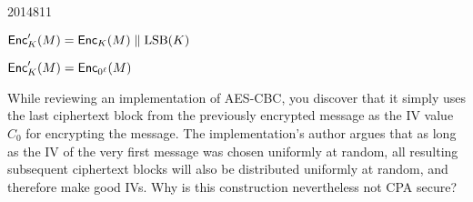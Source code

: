 \documentclass[10pt,\jkfside,a4paper]{article}
\theoremstyle{definition}
\newenvironment{qlist}[1][]{\begin{enumerate}[#1, labelsep=20pt]}{\end{enumerate}}
\newenvironment{question}{\begin{questionbox} \item}{\end{questionbox}}
\begin{document}
\begin{examquestion}{2014}{8}{11}
\begin{qlist}[label=(\textit{\alph*})]
\begin{qlist}[label=(\textit{\roman*})]
\begin{question}
            $\mathsf{Enc}_K'(M) = \mathsf{Enc}_K(M) \parallel \mathrm{LSB}(K)$

        \end{question}


        \begin{question}

            $\mathsf{Enc}_K'(M) = \mathsf{Enc}_{0^\ell}(M)$

        \end{question}


    \end{qlist}

    \begin{question}

        While reviewing an implementation of AES-CBC, you discover that it simply uses the last ciphertext block from the previously encrypted message as the IV value $C_0$ for encrypting the message. The implementation's author argues that as long as the IV of the very first message was chosen uniformly at random, all resulting subsequent ciphertext blocks will also be distributed uniformly at random, and therefore make good IVs. Why is this construction nevertheless not CPA secure?

    \end{question}


\end{qlist}

\end{examquestion}
\end{document}
